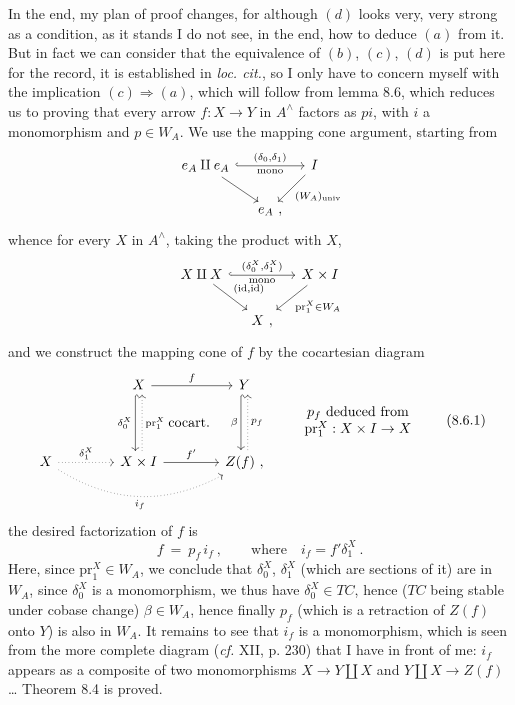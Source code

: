 In the end, my plan of proof changes, for although $(d)$ looks very, very strong as a condition, as it stands I do not see, in the end, how to deduce $(a)$ from it. But in fact we can consider that the equivalence of $(b)$, $(c)$, $(d)$ is put here for the record, it is established in \textit{loc. cit.}, so I only have to concern myself with the implication $(c) \Longrightarrow (a)$, which will follow
from lemma 8.6, which reduces us to proving that every arrow $f : X \longrightarrow Y$ in $A^\wedge$ factors as $pi$, with $i$ a monomorphism and $p \in W_A$. We use the mapping cone argument, starting from
\[
\begin{tikzcd}[column sep=small]
e_A \amalg e_A \arrow[rr, hook, "{(\delta_0,\delta_1)}", "\text{mono}"'] \arrow[dr] & & I \arrow[dl, "(W_A)_{\mathrm{univ}}"] \\
& e_A\ , &
\end{tikzcd}
\]
whence for every $X$ in $A^\wedge$, taking the product with $X$,
\[
\begin{tikzcd}[column sep=small]
X \amalg X \arrow[rr, hook, "{(\delta_0^X,\delta_1^X)}", "\text{mono}"'] \arrow[dr, "{(\mathrm{id},\mathrm{id})}"] & & X \times I \arrow[dl, "\mathrm{pr}_1^X \in W_A"] \\
& X\ , &
\end{tikzcd}
\]
and we construct the mapping cone of $f$ by the cocartesian diagram
\[
\begin{tikzcd}[column sep=4em,row sep=4em]
 & X \arrow[r, "f"] \arrow[d, hook, shift right, "\delta_0^X"'] \arrow[dr, phantom, "\text{cocart.}"] & Y \arrow[d, hook, shift right, "\beta"'] \\
X \arrow[r, dotted, "\delta_1^X"] \arrow[rr, dotted, bend right, "i_f"'] & X \times I \arrow[r, "f'"] \arrow[u, dotted, shift right, "\mathrm{pr}_1^X"'] & Z(f)\ , \arrow[u, dotted, shift right, "p_f"']
\end{tikzcd}
\qquad
\begin{array}{c}
p_f \text{ deduced from} \\
\mathrm{pr}_1^X : X \times I \to X
\end{array}
\tag*{(8.6.1)}
\]
the desired factorization of $f$ is
\[
f \ = \ p_f\, i_f\ , \qquad \text{where}\quad i_f = f'\delta_1^X\ .
\]
Here, since $\mathrm{pr}_1^X \in W_A$, we conclude that
$\delta_0^X$, $\delta_1^X$ (which are sections of it) are in $W_A$, since $\delta_0^X$ is a monomorphism, we thus have $\delta_0^X \in TC$, hence ($TC$ being stable under cobase change) $\beta \in W_A$, hence finally $p_f$ (which is a retraction of $Z(f)$ onto $Y$) is also in $W_A$. It remains to see that $i_f$ is a monomorphism, which is seen from the more complete diagram (\textit{cf.} XII, p. 230) that I have in front of me: $i_f$ appears as a composite of two monomorphisms $X \longrightarrow Y \amalg X$ and $Y \amalg X \longrightarrow Z(f)$ \ldots{} Theorem 8.4 is proved.

